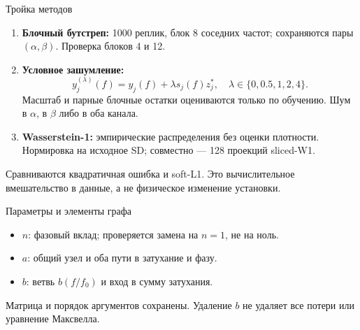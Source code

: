 \documentclass{beamer}
\begin{document}
\begin{frame}{Тройка методов}\small
\begin{enumerate}
\item \textbf{Блочный бутстреп:} 1000 реплик, блок 8 соседних частот;
сохраняются пары $(\alpha,\beta)$. Проверка блоков 4 и 12.
\item \textbf{Условное зашумление:}
\[
y_j^{(\lambda)}(f)=y_j(f)+\lambda s_j(f)z_j^*,\quad
\lambda\in\{0,0.5,1,2,4\}.
\]
Масштаб и парные блочные остатки оцениваются только по обучению.
Шум в $\alpha$, в $\beta$ либо в оба канала.
\item \textbf{Wasserstein-1:} эмпирические распределения без оценки плотности.
Нормировка на исходное SD; совместно --- 128 проекций sliced-W1.
\end{enumerate}
\medskip
Сравниваются квадратичная ошибка и soft-L1.
Это вычислительное вмешательство в данные, а не физическое изменение установки.
\end{frame}

\begin{frame}{Параметры и элементы графа}
\centering
{}
\small
\begin{itemize}
\item $n$: фазовый вклад; проверяется замена на $n=1$, не на ноль.
\item $a$: общий узел и оба пути в затухание и фазу.
\item $b$: ветвь $b(f/f_0)$ и вход в сумму затухания.
\end{itemize}
\footnotesize Матрица и порядок аргументов сохранены. Удаление $b$ не удаляет все потери или уравнение Максвелла.
\end{frame}
\end{document}
